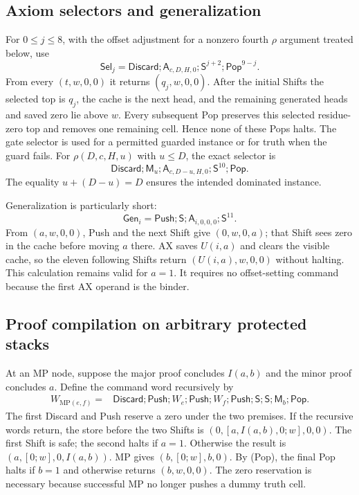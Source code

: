 \subsection{Axiom selectors and generalization}

For $0\le j\le8$, with the offset adjustment for a nonzero fourth
$\rho$ argument treated below, use
\[
 \mathsf{Sel}_j=
 \mathsf{Discard};\mathsf A_{c,D,H,0};
       \mathsf S^{j+2};\mathsf{Pop}^{9-j}.                 \tag{Sel}
\]
From every $(t,w,0,0)$ it returns $(q_j,w,0,0)$.
After the initial Shifts the selected top is $q_j$, the cache is the next
head, and the remaining generated heads and saved zero lie above $w$.
Every subsequent Pop preserves this selected residue-zero top and removes
one remaining cell.  Hence none of these Pops halts.  The gate selector
is used for a permitted guarded instance or for truth when the guard fails.
For $\rho(D,c,H,u)$ with $u\le D$, the exact selector is
\[
 \mathsf{Discard};\mathsf M_u;
 \mathsf A_{c,D-u,H,0};\mathsf S^{10};\mathsf{Pop}.
\]
The equality $u+(D-u)=D$ ensures the intended dominated instance.

Generalization is particularly short:
\[
 \mathsf{Gen}_i=
 \mathsf{Push};\mathsf S;\mathsf A_{i,0,0,0};\mathsf S^{11}.  \tag{Gen}
\]
From $(a,w,0,0)$, Push and the next Shift give $(0,w,0,a)$; that Shift
sees zero in the cache before moving $a$ there.  AX saves $U(i,a)$ and
clears the visible cache, so the eleven following Shifts return
$(U(i,a),w,0,0)$ without halting.  This calculation remains valid for
$a=1$.  It requires no offset-setting command because the first AX
operand is the binder.

\subsection{Proof compilation on arbitrary protected stacks}

At an MP node, suppose the major proof concludes $I(a,b)$ and the minor
proof concludes $a$.  Define the command word recursively by
\[
\begin{split}
 W_{\mathrm{MP}(e,f)}={}&\mathsf{Discard};\mathsf{Push};
 W_e;\mathsf{Push};W_f;\mathsf{Push};\mathsf S;\mathsf S;
                         \mathsf M_b;\mathsf{Pop}.
\end{split}\tag{MP-word}
\]
The first Discard and Push reserve a zero under the two premises.
If the recursive words return, the store before the two Shifts is
$(0,[a,I(a,b),0;w],0,0)$.  The first Shift is safe; the second halts
if $a=1$.  Otherwise the result is $(a,[0;w],0,I(a,b))$.
MP gives $(b,[0;w],b,0)$.  By (Pop), the final Pop halts if $b=1$
and otherwise returns $(b,w,0,0)$.  The zero reservation is necessary
because successful MP no longer pushes a dummy truth cell.


